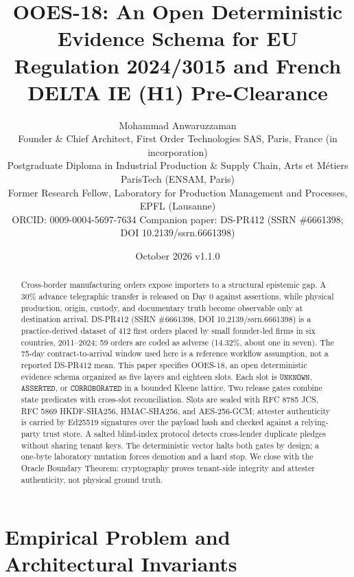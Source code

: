 \documentclass[10pt,twocolumn,a4paper]{article}
\title{\vspace{-1.5em}\large\bfseries OOES-18: An Open Deterministic Evidence Schema for EU Regulation 2024/3015 and French DELTA IE (H1) Pre-Clearance}
\author{%
\small Mohammad Anwaruzzaman\\[-1pt]
\scriptsize Founder \& Chief Architect, First Order Technologies SAS, Paris, France (in incorporation)\\[-1pt]
\scriptsize Postgraduate Diploma in Industrial Production \& Supply Chain, Arts et M\'etiers ParisTech (ENSAM, Paris)\\[-1pt]
\scriptsize Former Research Fellow, Laboratory for Production Management and Processes, EPFL (Lausanne)\\[-1pt]
\scriptsize ORCID: 0009-0004-5697-7634 \quad Companion paper: DS-PR412 (SSRN \#6661398; DOI 10.2139/ssrn.6661398)%
}
\date{\small October 2026 \quad v1.1.0}
\newcommand{\code}[1]{\texttt{\footnotesize\detokenize{#1}}}
\newcommand{\STATE}[1]{\ensuremath{\mathtt{#1}}}
\begin{document}
\maketitle
\thispagestyle{plain}
\small

\begin{abstract}
\small
Cross-border manufacturing orders expose importers to a structural epistemic gap. A 30\% advance telegraphic transfer is released on Day 0 against assertions, while physical production, origin, custody, and documentary truth become observable only at destination arrival. DS-PR412 (SSRN \#6661398, DOI 10.2139/ssrn.6661398) is a practice-derived dataset of 412 first orders placed by small founder-led firms in six countries, 2011--2024; 59 orders are coded as adverse (14.32\%, about one in seven). The 75-day contract-to-arrival window used here is a reference workflow assumption, not a reported DS-PR412 mean. This paper specifies OOES-18, an open deterministic evidence schema organized as five layers and eighteen slots. Each slot is \STATE{UNKNOWN}, \STATE{ASSERTED}, or \STATE{CORROBORATED} in a bounded Kleene lattice. Two release gates combine state predicates with cross-slot reconciliation. Slots are sealed with RFC 8785 JCS, RFC 5869 HKDF-SHA256, HMAC-SHA256, and AES-256-GCM; attester authenticity is carried by Ed25519 signatures over the payload hash and checked against a relying-party trust store. A salted blind-index protocol detects cross-lender duplicate pledges without sharing tenant keys. The deterministic vector \code{CASCADE-2026-9F4A2C} halts both gates by design; a one-byte laboratory mutation forces demotion and a \code{GATE_02} hard stop. We close with the Oracle Boundary Theorem: cryptography proves tenant-side integrity and attester authenticity, not physical ground truth.
\end{abstract}

\section{Empirical Problem and Architectural Invariants}
\end{document}

